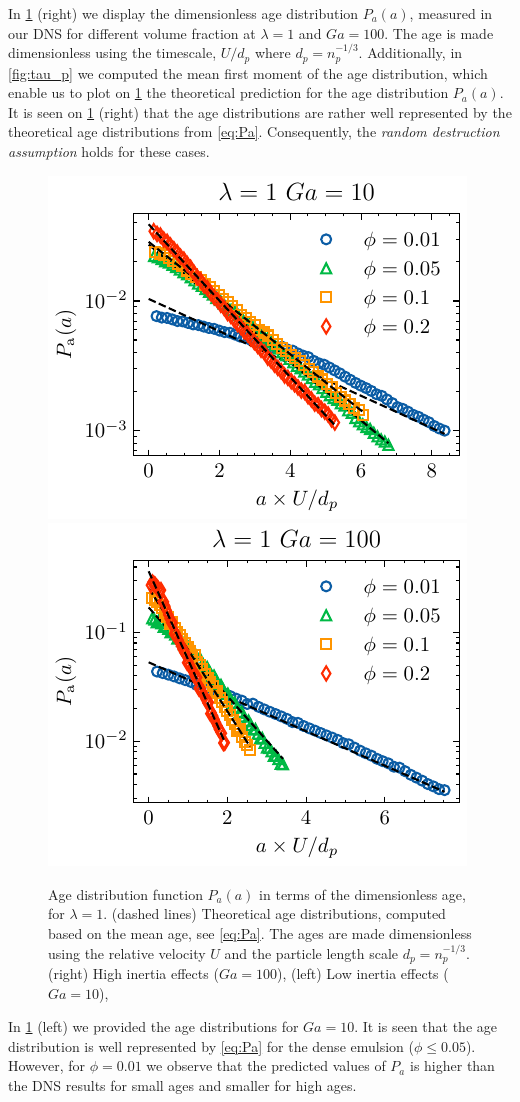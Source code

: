 In \ref{fig:age_picture} (right) we display the dimensionless age distribution $P_a(a)$, measured in our DNS for different volume fraction at $\lambda =1$ and $Ga = 100$. 
The age is made dimensionless using the timescale, $U/d_p$ where $d_p = n_p^{-1/3}$.
Additionally, in \ref{fig:tau_p} we computed the mean first moment of the age distribution, which enable us to plot on \ref{fig:age_picture} the theoretical prediction for the age distribution $P_a(a)$. 
It is seen on \ref{fig:age_picture} (right) that the age distributions are rather well represented by the theoretical age distributions from \ref{eq:Pa}.
Consequently, the \textit{random destruction assumption} holds for these cases. 
\begin{figure}[h!]
    \centering
    \includegraphics[height = 0.3\textwidth]{image/HOMOGENEOUS_NEW/Dist/Pa_l_1_Ga_10.pdf}
    \includegraphics[height = 0.3\textwidth]{image/HOMOGENEOUS_NEW/Dist/Pa_l_1_Ga_100.pdf}
    \caption{
    Age distribution function $P_a(a)$ in terms of the dimensionless age, for $\lambda = 1$.
    (dashed lines) Theoretical age distributions, computed based on the mean age, see \ref{eq:Pa}. 
    The ages are made dimensionless using the relative velocity $U$ and the particle length scale $d_p = n_p^{-1/3}$.  
    (right) High inertia effects ($Ga = 100$),
    (left) Low inertia effects ($Ga = 10$),
    }
    \label{fig:age_picture}
\end{figure}
In \ref{fig:age_picture} (left)  we provided the age distributions for $Ga = 10$. 
It is seen that the age distribution is well represented by \ref{eq:Pa} for the dense emulsion ($\phi \le 0.05$).
However, for $\phi = 0.01$ we observe that the predicted values of $P_a$ is higher than the DNS results for small ages and smaller for high ages. 
